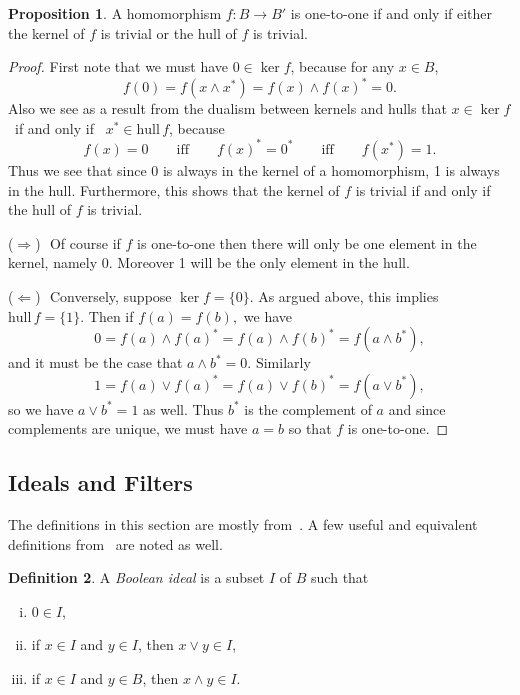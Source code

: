 \documentclass[11pt,titlepage]{article}
\newcommand{\spifff}{\qquad\text{iff}\qquad}
\newcommand{\hull}{\text{hull}\,}
\newcommand{\forward}{\noindent ($\Longrightarrow$) \,\,}
\newcommand{\back}{\noindent ($\Longleftarrow$) \,\,}
\theoremstyle{definition}
\newtheorem{definition}{Definition}[subsection]
\newtheorem{proposition}[definition]{Proposition}
\begin{document}
\begin{proposition} \label{1.1}A homomorphism $f: B \to B'$ is one-to-one  if and only if either the kernel of $f$ is trivial or the hull of $f$ is trivial.\end{proposition}
\begin{proof} First note that we must have $0\in\ker f$, because for any $x\in B$, $$f(0)=f(x\land x^*) = f(x)\land f(x)^* = 0.$$ Also we see as a result from the dualism between kernels and hulls that $x\in\ker f$ \ if and only if \ $x^*\in\hull f$, because $$f(x)=0 \spifff f(x)^*=0^* \spifff f(x^*)=1.$$ Thus we see that since $0$ is always in the kernel of a homomorphism, 1 is always in the hull. Furthermore, this shows that the kernel of $f$ is trivial if and only if the hull of $f$ is trivial.

\forward Of course if $f$ is one-to-one then there will only be one element in the kernel, namely 0. Moreover 1 will be the only element in the hull.

 \back Conversely, suppose $\ker f =\{0\}$. As argued above, this implies $\hull f =\{1\}.$ Then if $f(a)=f(b),$ we have $$0=f(a) \land f(a)^* = f(a)\land f(b)^*=f(a\land b^*),$$ and it must be the case that $a\land b^*=0$. Similarly $$1=f(a)\lor f(a)^*= f(a)\lor f(b)^*=f(a\lor b^*),$$ so we have $a\lor b^* =1$ as well. Thus $b^*$ is the complement of $a$ and since complements are unique, we must have $a=b$ so that $f$ is one-to-one.
\end{proof}


\subsection{Ideals and Filters}\label{filterintro}

The definitions in this section are mostly from~\cite{Halmos}. A few useful and equivalent definitions from~\cite{Bell} are noted as well.
\begin{definition} A {\em Boolean ideal} is a subset $I$ of $B$ such that \begin{enumerate}[(i)]	
\item{$0\in I$,}
\item{if $x\in I$ and $y\in I$, then $x\lor y\in I$,}
\item{if $x\in I$ and $y\in B$, then $x\land y\in I$.}
\end{enumerate} \end{definition}
\end{document}
